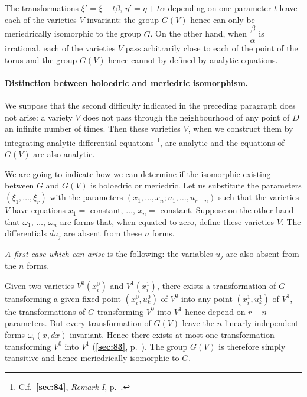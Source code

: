 \documentclass[leqno,11pt]{book}
\numberwithin{equation}{chapter}
\theoremstyle{shape1}
\theoremstyle{shapesmall}
\newcommand{\fsref}[1]{{\rm\textsection\textbf{\ref{sec:#1}}}}
\newcommand{\somespace}{\vspace{9pt}}
\begin{document}
The transformations $\xi'=\xi-t\beta$, $\eta'=\eta+t\alpha$ depending on one parameter $t$ leave each of the varieties $V$ invariant: the group $G(V)$ hence can only be meriedrically isomorphic to the group $G$. On the other hand, when $\dfrac{\beta}{\alpha}$ is irrational, each of the varieties $V$ pass arbitrarily close to each of the point of the torus and the group $G(V)$ hence cannot by defined by analytic equations. 

\paragraph{Distinction between holoedric and meriedric isomorphism.}
\label{sec:118}
We suppose that the second difficulty indicated in the preceding paragraph does not arise: a variety $V$ does not pass through the neighbourhood of any point of $D$ an infinite number of times. Then these varieties $V$, when we construct them by integrating analytic differential equations \footnote{C.f.~\fsref{84}, \emph{Remark I}, p.~\pageref{sec:84}.}, are analytic and the equations of $G(V)$ are also analytic.

We are going to indicate how we can determine if the isomorphic existing between $G$ and $G(V)$ is holoedric or meriedric. Let us substitute the parameters $(\xi_{1},\dots,\xi_{r})$ with the parameters $(x_{1},\dots,x_{n};u_{1},\dots,u_{r-n})$ such that the varieties $V$ have equations $x_{1}=$ constant, $\dots$, $x_{n}=$ constant. Suppose on the other hand that $\omega_{1}$, $\dots$, $\omega_{n}$ are forms that, when equated to zero, define these varieties $V$. The differentials $du_{j}$ are absent from these $n$ forms.

\somespace

\emph{A first case which can arise} is the following: the variables $u_{j}$ are also absent from the $n$ forms.

Given two varieties $V^{0}(x^{0}_{i})$ and $V^{1}(x^{1}_{i})$, there exists a transformation of $G$ transforming a given fixed point $(x^{0}_{i},u^{0}_{k})$ of $V^{0}$ into any point $(x^{1}_{i},u^{1}_{k})$ of $V^{1}$, the transformations of $G$ transforming $V^{0}$ into $V^{1}$ hence depend on $r-n$ parameters. But every transformation of $G(V)$ leave the $n$ linearly independent forms $\omega_{i}(x,dx)$ invariant. Hence there exists at most one transformation transforming $V^{0}$ into $V^{1}$ (\fsref{83}, p.~\pageref{sec:83}). The group $G(V)$ is therefore simply transitive and hence meriedrically isomorphic to $G$.
\end{document}
